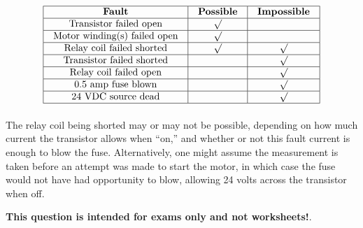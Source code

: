 \vfil 

\eject







$$\vbox{\offinterlineskip
\halign{\strut
\vrule \quad\hfil # \ \hfil & 
\vrule \quad\hfil # \ \hfil & 
\vrule \quad\hfil # \ \hfil \vrule \cr
\noalign{\hrule}
%
{\bf Fault} & {\bf Possible} & {\bf Impossible} \cr
%
\noalign{\hrule}
%
Transistor failed open & $\surd$ &  \cr
%
\noalign{\hrule}
%
Motor winding(s) failed open & $\surd$ &  \cr
%
\noalign{\hrule}
%
Relay coil failed shorted & $\surd$ & $\surd$ \cr
%
\noalign{\hrule}
%
Transistor failed shorted &  & $\surd$ \cr
%
\noalign{\hrule}
%
Relay coil failed open &  & $\surd$ \cr
%
\noalign{\hrule}
%
0.5 amp fuse blown &  & $\surd$ \cr
%
\noalign{\hrule}
%
24 VDC source dead &  & $\surd$ \cr
%
\noalign{\hrule}
} %
}$$ %

The relay coil being shorted may or may not be possible, depending on how much current the transistor allows when ``on,'' and whether or not this fault current is enough to blow the fuse.  Alternatively, one might assume the measurement is taken before an attempt was made to start the motor, in which case the fuse would not have had opportunity to blow, allowing 24 volts across the transistor when off.







{\bf This question is intended for exams only and not worksheets!}.


